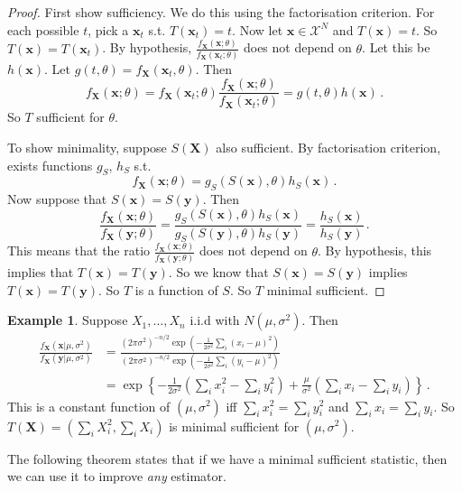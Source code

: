 \documentclass[a4paper,11pt]{article}
\theoremstyle{definition}
\newtheorem*{ex}{Example}
\numberwithin{equation}{section}
\begin{document}
\begin{proof}
First show sufficiency. We do this using the factorisation criterion. For each possible $t$, pick a $\mathbf{x}_t$ s.t. $T(\mathbf{x}_t)=t$. Now let $\mathbf{x}\in\mathcal{X}^N$ and $T(\mathbf{x})=t$. So $T(\mathbf{x})=T(\mathbf{x}_t)$. By hypothesis, 
$\frac{f_\mathbf{X}(\mathbf{x};\theta)}{f_\mathbf{X}(\mathbf{x}_t;\theta)}$ does not depend on $\theta$. Let this be $h(\mathbf{x})$. Let $g(t,\theta)=f_\mathbf{X}(\mathbf{x}_t,\theta)$. Then
\[
f_\mathbf{X}(\mathbf{x};\theta)=f_\mathbf{X}(\mathbf{x}_t;\theta)\frac{f_\mathbf{X}(\mathbf{x};\theta)}{f_\mathbf{X}(\mathbf{x}_t;\theta)}= g(t,\theta)h(\mathbf{x})\,.
\]
So $T$ sufficient for $\theta$.

To show minimality, suppose $S(\mathbf{X})$ also sufficient. By factorisation criterion, exists functions $g_S$, $h_S$ s.t.
\[
f_\mathbf{X}(\mathbf{x};\theta)=g_S(S(\mathbf{x}),\theta)h_S(\mathbf{x})\,.
\]
Now suppose that $S(\mathbf{x})=S(\mathbf{y})$. Then
\[
\frac{f_\mathbf{X}(\mathbf{x};\theta)}{f_\mathbf{X}(\mathbf{y};\theta)}=\frac{g_S(S(\mathbf{x}),\theta)h_S(\mathbf{x})}{g_S(S(\mathbf{y}),\theta)h_S(\mathbf{y})}=\frac{h_S(\mathbf{x})}{h_S(\mathbf{y})}\,.
\]
This means that the ratio $\frac{f_\mathbf{X}(\mathbf{x};\theta)}{f_\mathbf{X}(\mathbf{y};\theta)}$ does not depend on $\theta$. By hypothesis, this implies that $T(\mathbf{x})=T(\mathbf{y})$. So we know that $S(\mathbf{x})=S(\mathbf{y})$ implies $T(\mathbf{x})=T(\mathbf{y})$. So $T$ is a function of $S$. So $T$ minimal sufficient.
\end{proof}

\begin{ex}
Suppose $X_1,...,X_n$ i.i.d with $N(\mu,\sigma^2)$. Then 
\begin{align*}
    \frac{f_\mathbf{X}(\mathbf{x}|\mu,\sigma^2)}{f_\mathbf{X}(\mathbf{y}|\mu,\sigma^2)}&=\frac{(2\pi\sigma^2)^{-n/2}\exp\left(-\frac{1}{2\sigma^2}\sum_i(x_i-\mu)^2\right)}{(2\pi\sigma^2)^{-n/2}\exp\left(-\frac{1}{2\sigma^2}\sum_i(y_i-\mu)^2\right)}\\
    &=\exp\left\{-\frac{1}{2\sigma^2}\left(\sum_i x_i^2-\sum_i y_i^2\right)+\frac{\mu}{\sigma^2}\left(\sum_i x_i-\sum_i y_i\right)\right\}\,.
\end{align*}
This is a constant function of $(\mu,\sigma^2)$ iff $\sum_i x_i^2=\sum_i y_i^2$ and $\sum_i x_i=\sum_i y_i$. So $T(\mathbf{X})=(\sum_i X_i^2, \sum_i X_i)$ is minimal sufficient for $(\mu,\sigma^2)$.
\end{ex}

The following theorem states that if we have a minimal sufficient statistic, then we can use it to improve \emph{any} estimator.
\end{document}
